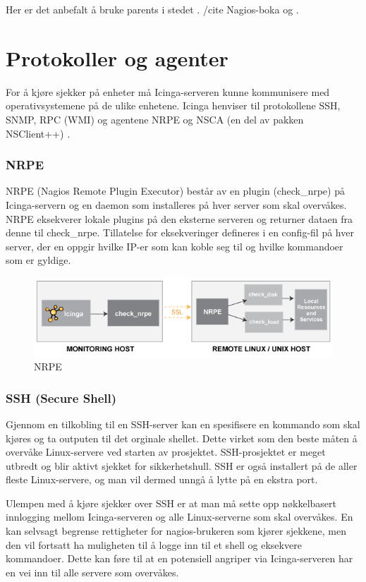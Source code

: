 Her er det anbefalt å bruke parents i stedet \cite{hostandservicedep}. /cite Nagios-boka og .

\section{Protokoller og agenter }
For å kjøre sjekker på enheter må Icinga-serveren kunne kommunisere med operativsystemene på de ulike enhetene. Icinga henviser til protokollene SSH, SNMP, RPC (WMI) og agentene NRPE og NSCA (en del av pakken NSClient++) \cite{icingaintegration} \cite{icingaadditionalsoftware}. 

\subsubsection{NRPE}
NRPE (Nagios Remote Plugin Executor) består av en plugin (check\_nrpe) på Icinga-servern og en daemon som installeres på hver server som skal overvåkes. NRPE eksekverer lokale plugins på den eksterne serveren og returner dataen fra denne til check\_nrpe. Tillatelse for eksekveringer defineres i en config-fil på hver server, der en oppgir hvilke IP-er som kan koble seg til og hvilke kommandoer som er gyldige. 

\begin{figure}
    \centering
    \includegraphics[scale=0.6]{img/nrpe.png}
    \caption{NRPE}
    \label{nrpe}
\end{figure}


\subsubsection{SSH (Secure Shell)}

Gjennom en tilkobling til en SSH-server kan en spesifisere en kommando som skal kjøres og ta outputen til det orginale shellet. Dette virket som den beste måten å overvåke Linux-servere ved starten av prosjektet. SSH-prosjektet er meget utbredt og blir aktivt sjekket for sikkerhetshull. SSH er også installert på de aller fleste Linux-servere, og man vil dermed unngå å lytte på en ekstra port. 

Ulempen med å kjøre sjekker over SSH er at man må sette opp nøkkelbasert innlogging mellom Icinga-serveren og alle Linux-serverne som skal overvåkes. En kan selvsagt begrense rettigheter for nagios-brukeren som kjører sjekkene, men den vil fortsatt ha muligheten til å logge inn til et shell og eksekvere kommandoer. Dette kan føre til at en potensiell angriper via Icinga-serveren har en vei inn til alle servere som overvåkes.

